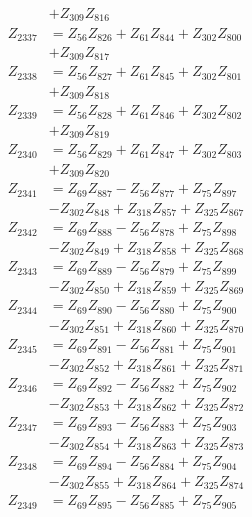 \begin{multicols}{2}
\begin{align}
&+ Z_{309}Z_{816} \nonumber \\
Z_{2337} &= Z_{56}Z_{826} + Z_{61}Z_{844} + Z_{302}Z_{800}  \nonumber \\
&+ Z_{309}Z_{817} \nonumber \\
Z_{2338} &= Z_{56}Z_{827} + Z_{61}Z_{845} + Z_{302}Z_{801}  \nonumber \\
&+ Z_{309}Z_{818} \nonumber \\
Z_{2339} &= Z_{56}Z_{828} + Z_{61}Z_{846} + Z_{302}Z_{802}  \nonumber \\
&+ Z_{309}Z_{819} \nonumber \\
Z_{2340} &= Z_{56}Z_{829} + Z_{61}Z_{847} + Z_{302}Z_{803}  \nonumber \\
&+ Z_{309}Z_{820} \nonumber \\
Z_{2341} &= Z_{69}Z_{887} - Z_{56}Z_{877} + Z_{75}Z_{897}  \nonumber \\
&- Z_{302}Z_{848} + Z_{318}Z_{857} + Z_{325}Z_{867} \nonumber \\
Z_{2342} &= Z_{69}Z_{888} - Z_{56}Z_{878} + Z_{75}Z_{898}  \nonumber \\
&- Z_{302}Z_{849} + Z_{318}Z_{858} + Z_{325}Z_{868} \nonumber \\
Z_{2343} &= Z_{69}Z_{889} - Z_{56}Z_{879} + Z_{75}Z_{899}  \nonumber \\
&- Z_{302}Z_{850} + Z_{318}Z_{859} + Z_{325}Z_{869} \nonumber \\
Z_{2344} &= Z_{69}Z_{890} - Z_{56}Z_{880} + Z_{75}Z_{900}  \nonumber \\
&- Z_{302}Z_{851} + Z_{318}Z_{860} + Z_{325}Z_{870} \nonumber \\
Z_{2345} &= Z_{69}Z_{891} - Z_{56}Z_{881} + Z_{75}Z_{901}  \nonumber \\
&- Z_{302}Z_{852} + Z_{318}Z_{861} + Z_{325}Z_{871} \nonumber \\
Z_{2346} &= Z_{69}Z_{892} - Z_{56}Z_{882} + Z_{75}Z_{902}  \nonumber \\
&- Z_{302}Z_{853} + Z_{318}Z_{862} + Z_{325}Z_{872} \nonumber \\
Z_{2347} &= Z_{69}Z_{893} - Z_{56}Z_{883} + Z_{75}Z_{903}  \nonumber \\
&- Z_{302}Z_{854} + Z_{318}Z_{863} + Z_{325}Z_{873} \nonumber \\
Z_{2348} &= Z_{69}Z_{894} - Z_{56}Z_{884} + Z_{75}Z_{904}  \nonumber \\
&- Z_{302}Z_{855} + Z_{318}Z_{864} + Z_{325}Z_{874} \nonumber \\
Z_{2349} &= Z_{69}Z_{895} - Z_{56}Z_{885} + Z_{75}Z_{905}  \nonumber \\

\end{align}
\end{multicols}
